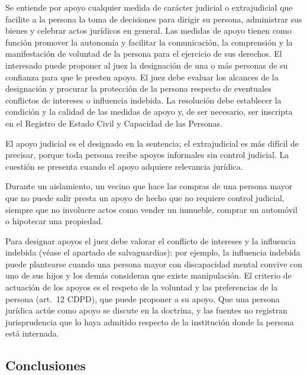 \documentclass[12pt,oneside]{book}
\begin{document}
\begin{regla}
Se entiende por apoyo cualquier medida de carácter judicial o extrajudicial que facilite a la persona la toma de decisiones para dirigir su persona, administrar sus bienes y celebrar actos jurídicos en general. Las medidas de apoyo tienen como función promover la autonomía y facilitar la comunicación, la comprensión y la manifestación de voluntad de la persona para el ejercicio de sus derechos. El interesado puede proponer al juez la designación de una o más personas de su confianza para que le presten apoyo. El juez debe evaluar los alcances de la designación y procurar la protección de la persona respecto de eventuales conflictos de intereses o influencia indebida. La resolución debe establecer la condición y la calidad de las medidas de apoyo y, de ser necesario, ser inscripta en el Registro de Estado Civil y Capacidad de las Personas.
\end{regla}

El apoyo judicial es el designado en la sentencia; el extrajudicial es más difícil de precisar, porque toda persona recibe apoyos informales sin control judicial. La cuestión se presenta cuando el apoyo adquiere relevancia jurídica.

\begin{ejemplo}
Durante un aislamiento, un vecino que hace las compras de una persona mayor que no puede salir presta un apoyo de hecho que no requiere control judicial, siempre que no involucre actos como vender un inmueble, comprar un automóvil o hipotecar una propiedad.
\end{ejemplo}

Para designar apoyos el juez debe valorar el conflicto de intereses y la influencia indebida (véase el apartado de salvaguardias): por ejemplo, la influencia indebida puede plantearse cuando una persona mayor con discapacidad mental convive con uno de sus hijos y los demás consideran que existe manipulación. El criterio de actuación de los apoyos es el respeto de la voluntad y las preferencias de la persona (art.~12 CDPD), que puede proponer a su apoyo. Que una persona jurídica actúe como apoyo se discute en la doctrina, y las fuentes no registran jurisprudencia que lo haya admitido respecto de la institución donde la persona está internada.

\subsection{Conclusiones}
\end{document}
